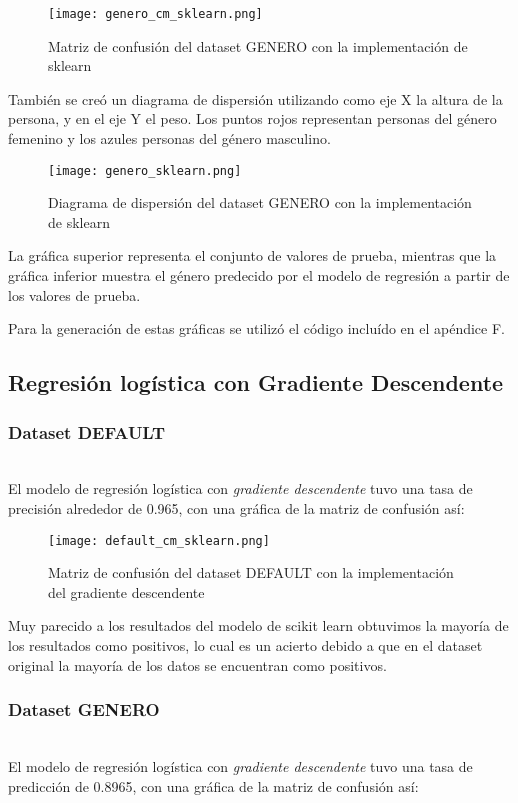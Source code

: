 \documentclass[sigconf,authorversion,nonacm]{acmart}
\begin{document}
\begin{figure}[H]
  \centering
  \texttt{[image: genero\_cm\_sklearn.png]}
  \caption{Matriz de confusión del dataset GENERO con la implementación de sklearn}
\end{figure}

También se creó un diagrama de dispersión utilizando como eje X la altura de la persona, y en el eje Y el peso. Los puntos rojos representan personas del género femenino y los azules personas del género masculino.

\begin{figure}[H]
  \centering
  \texttt{[image: genero\_sklearn.png]}
  \caption{Diagrama de dispersión del dataset GENERO con la implementación de sklearn}
\end{figure}

La gráfica superior representa el conjunto de valores de prueba, mientras que la gráfica inferior muestra el género predecido por el modelo de regresión a partir de los valores de prueba.

Para la generación de estas gráficas se utilizó el código incluído en el apéndice F.

\vfill

\subsection{Regresión logística con Gradiente Descendente}

\subsubsection{Dataset DEFAULT}\hfill\\
El modelo de regresión logística con \textit{gradiente descendente} tuvo una tasa de precisión alrededor de 0.965, con una gráfica de la matriz de confusión así:

\begin{figure}[H]
  \centering
  \texttt{[image: default\_cm\_sklearn.png]}
  \caption{Matriz de confusión del dataset DEFAULT con la implementación del gradiente descendente}
\end{figure}

Muy parecido a los resultados del modelo de scikit learn obtuvimos la mayoría de los resultados como positivos, lo cual es un acierto debido a que en el dataset original la mayoría de los datos se encuentran como positivos.

\subsubsection{Dataset GENERO}\hfill\\
El modelo de regresión logística con \textit{gradiente descendente} tuvo una tasa de predicción de 0.8965, con una gráfica de la matriz de confusión así:
\end{document}
